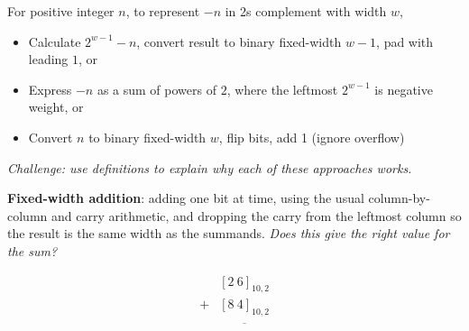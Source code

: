 \documentclass[12pt, oneside]{article}
\begin{document}
For positive integer $n$, to represent $-n$ in 
2s complement with width $w$,
\begin{itemize}
    \item Calculate $2^{w-1} - n$, convert 
    result to binary fixed-width $w-1$, pad 
    with leading $1$, or
    \item Express $-n$ as a sum of powers of $2$, 
    where the leftmost $2^{w-1}$ is negative weight, or
    \item Convert $n$ to binary fixed-width $w$, 
    flip bits, add 1 (ignore overflow)
\end{itemize}

{\it Challenge: use definitions to explain why
each of these approaches works.} \newpage


{\bf Fixed-width addition}: adding one bit at time, using the usual column-by-column and carry arithmetic, and dropping the carry from the leftmost column so the result is the same width as the summands.  {\it Does this give the right value for the sum?}


\begin{align*}
   & [2~ 6]_{10,2}\\
+ &  [8~ 4]_{10,2}\\
&\overline{\phantom{[0~0]_{10,2}}}\\
\end{align*}

\vfill
\end{document}
